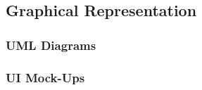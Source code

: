 

\subsection{Graphical Representation}
\bigskip

\subsubsection{UML Diagrams}

\subsubsection{UI Mock-Ups}















